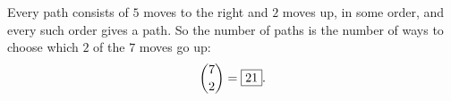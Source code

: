 Every path consists of $5$ moves to the right and $2$ moves up, in some order, and every such order gives a path. So the number of paths is the number of ways to choose which $2$ of the $7$ moves go up:
\[\dbinom72=\boxed{21}.\]

